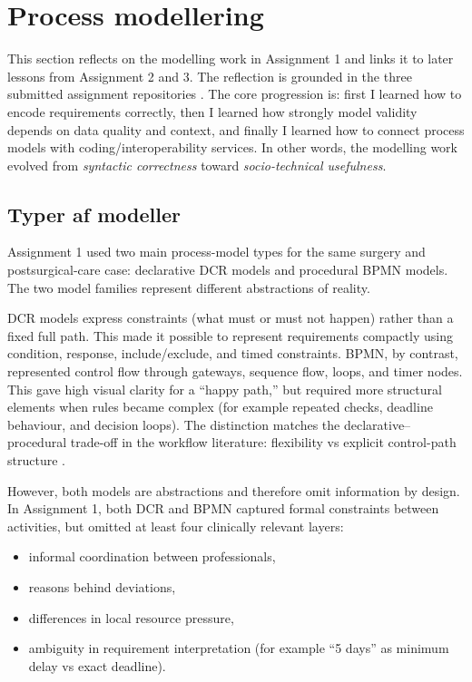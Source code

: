 \section{Process modellering}
\label{sec:process_modellering}

This section reflects on the modelling work in Assignment 1 and links it to later lessons from Assignment 2 and 3. The reflection is grounded in the three submitted assignment repositories \parencite{kristensen2026assignment1repo,kristensen2026assignment2repo,kristensen2026assignment3repo}. The core progression is: first I learned how to encode requirements correctly, then I learned how strongly model validity depends on data quality and context, and finally I learned how to connect process models with coding/interoperability services. In other words, the modelling work evolved from \textit{syntactic correctness} toward \textit{socio-technical usefulness}.

\subsection{Typer af modeller}
\label{subsec:process_typer_modeller}

Assignment 1 used two main process-model types for the same surgery and postsurgical-care case: declarative DCR models and procedural BPMN models. The two model families represent different abstractions of reality.

DCR models express constraints (what must or must not happen) rather than a fixed full path. This made it possible to represent requirements compactly using condition, response, include/exclude, and timed constraints. BPMN, by contrast, represented control flow through gateways, sequence flow, loops, and timer nodes. This gave high visual clarity for a ``happy path,'' but required more structural elements when rules became complex (for example repeated checks, deadline behaviour, and decision loops). The distinction matches the declarative--procedural trade-off in the workflow literature: flexibility vs explicit control-path structure \parencite{vanderaalst2009declarativeworkflows,hildebrandt2026process}.

However, both models are abstractions and therefore omit information by design. In Assignment 1, both DCR and BPMN captured formal constraints between activities, but omitted at least four clinically relevant layers:
\begin{itemize}
    \item informal coordination between professionals,
    \item reasons behind deviations,
    \item differences in local resource pressure,
    \item ambiguity in requirement interpretation (for example ``5 days'' as minimum delay vs exact deadline).
\end{itemize}

